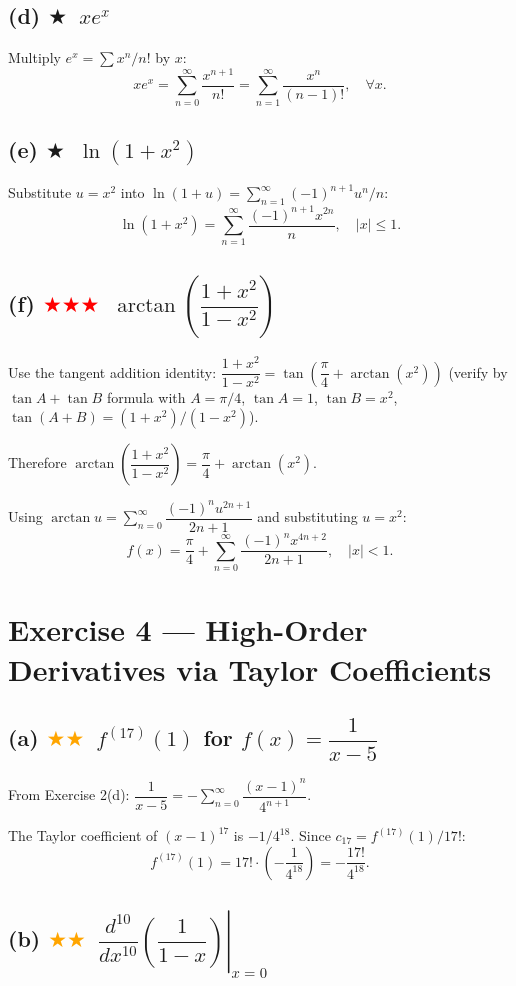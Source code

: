 \documentclass[12pt,a4paper]{article}
\newcommand{\easy}{\textcolor{green!60!black}{$\bigstar$}}
\newcommand{\medium}{\textcolor{orange}{$\bigstar\bigstar$}}
\newcommand{\hard}{\textcolor{red}{$\bigstar\bigstar\bigstar$}}
\begin{document}
\subsection*{(d) \easy\ $x e^x$}
Multiply $e^x=\sum x^n/n!$ by $x$:
\[
  xe^x = \sum_{n=0}^{\infty}\frac{x^{n+1}}{n!} = \sum_{n=1}^{\infty}\frac{x^n}{(n-1)!}, \quad \forall x.
\]

\subsection*{(e) \easy\ $\ln(1+x^2)$}
Substitute $u=x^2$ into $\ln(1+u)=\sum_{n=1}^{\infty}(-1)^{n+1}u^n/n$:
\[
  \ln(1+x^2) = \sum_{n=1}^{\infty}\frac{(-1)^{n+1}x^{2n}}{n}, \quad |x|\leq 1.
\]

\subsection*{(f) \hard\ $\arctan\!\left(\dfrac{1+x^2}{1-x^2}\right)$}

Use the tangent addition identity: $\dfrac{1+x^2}{1-x^2} = \tan\!\left(\dfrac{\pi}{4}+\arctan(x^2)\right)$ (verify by $\tan A+\tan B$ formula with $A=\pi/4$, $\tan A=1$, $\tan B=x^2$, $\tan(A+B)=(1+x^2)/(1-x^2)$).

Therefore $\arctan\!\left(\dfrac{1+x^2}{1-x^2}\right) = \dfrac{\pi}{4}+\arctan(x^2)$.

Using $\arctan u=\sum_{n=0}^{\infty}\dfrac{(-1)^n u^{2n+1}}{2n+1}$ and substituting $u=x^2$:
\[
  f(x) = \frac{\pi}{4} + \sum_{n=0}^{\infty}\frac{(-1)^n x^{4n+2}}{2n+1}, \quad |x|<1.
\]

\section*{Exercise 4 — High-Order Derivatives via Taylor Coefficients}

\subsection*{(a) \medium\ $f^{(17)}(1)$ for $f(x)=\dfrac{1}{x-5}$}

From Exercise 2(d): $\dfrac{1}{x-5}=-\sum_{n=0}^{\infty}\dfrac{(x-1)^n}{4^{n+1}}$.

The Taylor coefficient of $(x-1)^{17}$ is $-1/4^{18}$.  Since $c_{17}=f^{(17)}(1)/17!$:
\[
  f^{(17)}(1) = 17!\cdot\left(-\frac{1}{4^{18}}\right) = \boxed{-\frac{17!}{4^{18}}}.
\]

\subsection*{(b) \medium\ $\left.\dfrac{d^{10}}{dx^{10}}\!\left(\dfrac{1}{1-x}\right)\right|_{x=0}$}
\end{document}
